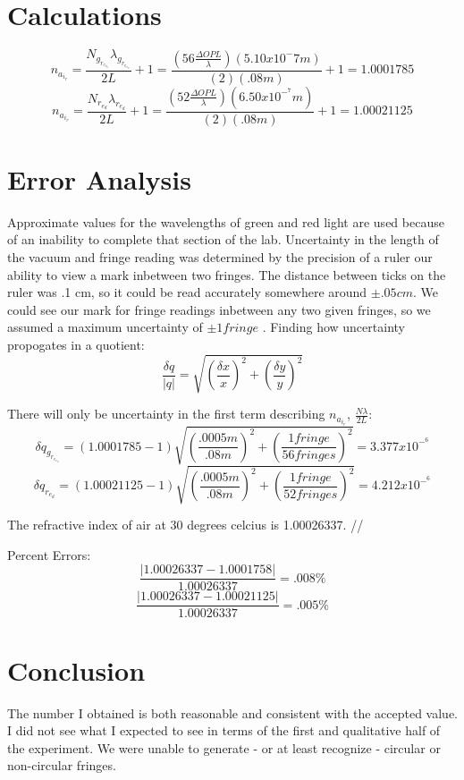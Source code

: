\documentclass[12pt]{article}
\begin{document}
\section{Calculations}
\[n_a_i_r = \frac{N_g_r_e_e_n\lambda_g_r_e_e_n}{2L}+1 = \frac{(56 \frac{\Delta OPL}{\lambda})(5.10 x 10^-7 m)}{(2)(.08 m)}+1 = 1.0001785 \]
\[n_a_i_r = \frac{N_r_e_d\lambda_r_e_d}{2L}+1 = \frac{(52 \frac{\Delta OPL}{\lambda})(6.50 x 10^-^7 m)}{(2)(.08 m)}+1 = 1.00021125 \]

\section{Error Analysis}
\indent \indent Approximate values for the wavelengths of green and red light are used because of an inability to complete that section of the lab. Uncertainty in the length of the vacuum and fringe reading was determined by the precision of a ruler our ability to view a mark inbetween two fringes. The distance between ticks on the ruler was .1 cm, so it could be read accurately somewhere around $\pm .05 cm$. We could see our mark for fringe readings inbetween any two given fringes, so we assumed a maximum uncertainty of $\pm 1 fringe$ . Finding how uncertainty propogates in a quotient:
\[\frac{\delta q}{|q|} = \sqrt{(\frac{\delta x}{x})^2 + (\frac{\delta y}{y})^2 } \]

\indent There will only be uncertainty in the first term describing $n_a_i_r$, $\frac{N\lambda}{2L}$:
\[\delta q_g_r_e_e_n = (1.0001785 - 1)\sqrt{(\frac{.0005 m}{.08 m})^2 + (\frac{1 fringe}{56 fringes})^2 } = 3.377 x 10^-^6 \]
\[\delta q_r_e_d = (1.00021125 - 1)\sqrt{(\frac{.0005 m}{.08 m})^2 + (\frac{1 fringe}{52 fringes})^2 } = 4.212 x 10^-^6 \]

\indent The refractive index of air at 30 degrees celcius is 1.00026337. //

\indent Percent Errors:
\[\frac{|1.00026337 - 1.0001758|}{1.00026337} = .008 \% \]
\[\frac{|1.00026337 - 1.00021125|}{1.00026337} = .005 \% \]

\section{Conclusion}
\indent \indent The number I obtained is both reasonable and consistent with the accepted value. I did not see what I expected to see in terms of the first and qualitative half of the experiment. We were unable to generate - or at least recognize - circular or non-circular fringes.
\end{document}
